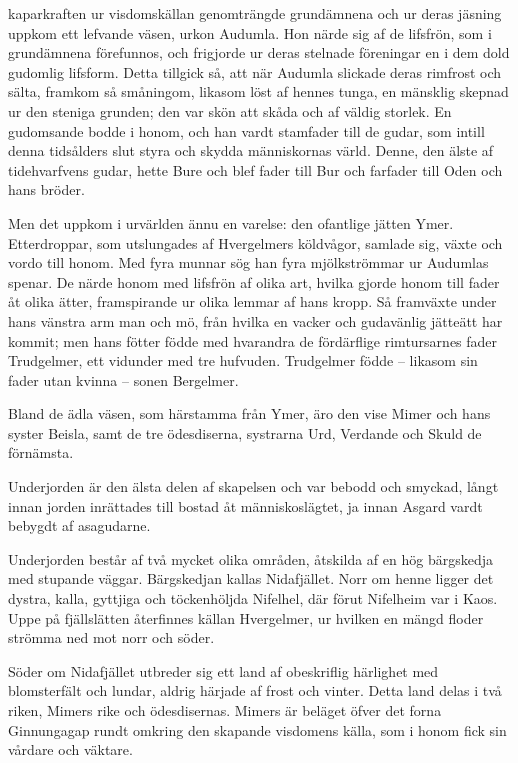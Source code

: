 
\dropcapS kaparkraften ur visdomskällan genomträngde grundämnena och ur deras
jäsning uppkom ett lefvande väsen, urkon Audumla. Hon närde sig af de
lifsfrön, som i grundämnena förefunnos, och frigjorde ur deras stelnade
föreningar en i dem dold gudomlig lifsform. Detta tillgick så, att när
Audumla slickade deras rimfrost och sälta, framkom så småningom, likasom
löst af hennes tunga, en mänsklig skepnad ur den steniga grunden; den
var skön att skåda och af väldig storlek. En gudomsande bodde i honom,
och han vardt stamfader till de gudar, som intill denna tidsålders slut
styra och skydda människornas värld. Denne, den älste af tidehvarfvens
gudar, hette Bure och blef fader till Bur och farfader till Oden och
hans bröder.

Men det uppkom i urvärlden ännu en varelse: den ofantlige jätten Ymer.
Etterdroppar, som utslungades af Hvergelmers köldvågor, samlade sig,
växte och vordo till honom. Med fyra munnar sög han fyra mjölkströmmar
ur Audumlas spenar. De närde honom med lifsfrön af olika art, hvilka
gjorde honom till fader åt olika ätter, framspirande ur olika lemmar af
hans kropp. Så framväxte under hans vänstra arm man och mö, från hvilka
en vacker och gudavänlig jätteätt har kommit; men hans fötter födde med
hvarandra de
fördärflige rimtursarnes fader Trudgelmer, ett vidunder med tre
hufvuden. Trudgelmer födde -- likasom sin fader utan kvinna -- sonen
Bergelmer.

Bland de ädla väsen, som härstamma från Ymer, äro den vise Mimer och
hans syster Beisla, samt de tre ödesdiserna, systrarna Urd, Verdande och
Skuld de förnämsta.


Underjorden är den älsta delen af skapelsen och var bebodd och smyckad,
långt innan jorden inrättades till bostad åt människoslägtet, ja innan
Asgard vardt bebygdt af asagudarne.

Underjorden består af två mycket olika områden, åtskilda af en hög
bärgskedja med stupande väggar. Bärgskedjan kallas Nidafjället. Norr om
henne ligger det dystra, kalla, gyttjiga och töckenhöljda Nifelhel, där
förut Nifelheim var i Kaos. Uppe på fjällslätten återfinnes källan
Hvergelmer, ur hvilken en mängd floder strömma ned mot norr och söder.

Söder om Nidafjället utbreder sig ett land af obeskriflig härlighet med
blomsterfält och lundar, aldrig härjade af frost och vinter. Detta land
delas i två riken, Mimers rike och ödesdisernas. Mimers är beläget öfver
det forna Ginnungagap rundt omkring den skapande visdomens källa, som i
honom fick sin vårdare och väktare.

